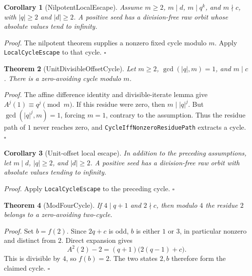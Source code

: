 \documentclass[11pt,letterpaper]{article}
\newtheorem{theorem}{Theorem}
\newtheorem{corollary}[theorem]{Corollary}
\newenvironment{proof}{\noindent\textit{Proof.}}{\hfill\(\square\)}
\begin{document}
\begin{corollary}[NilpotentLocalEscape]
Assume \(m\ge2\), \(m\mid d\), \(m\mid q^k\), and \(m\nmid c\),
with \(|q|\ge2\) and \(|d|\ge2\). A positive seed has a
division-free raw orbit whose absolute values tend to infinity.
\end{corollary}

\begin{proof}
The nilpotent theorem supplies a nonzero fixed cycle modulo \(m\).
Apply \texttt{Local\allowbreak Cycle\allowbreak Escape} to that cycle.
\end{proof}

\begin{theorem}[UnitDivisibleOffsetCycle]
Let \(m\ge2\), \(\gcd(|q|,m)=1\), and \(m\mid c\).
There is a zero-avoiding cycle modulo \(m\).
\end{theorem}

\begin{proof}
The affine difference identity and divisible-iterate lemma give
\(A^j(1)\equiv q^j\pmod m\). If this residue were zero, then
\(m\mid |q|^j\). But \(\gcd(|q|^j,m)=1\), forcing \(m=1\),
contrary to the assumption. Thus the residue path of \(1\) never
reaches zero, and \texttt{Cycle\allowbreak Iff\allowbreak Nonzero\allowbreak Residue\allowbreak Path} extracts a cycle.
\end{proof}

\begin{corollary}[Unit-offset local escape]
In addition to the preceding assumptions, let \(m\mid d\),
\(|q|\ge2\), and \(|d|\ge2\). A positive seed has a
division-free raw orbit with absolute values tending to infinity.
\end{corollary}

\begin{proof}
Apply \texttt{Local\allowbreak Cycle\allowbreak Escape} to the preceding cycle.
\end{proof}

\begin{theorem}[ModFourCycle]
If \(4\mid q+1\) and \(2\nmid c\), then modulo \(4\) the residue
\(2\) belongs to a zero-avoiding two-cycle.
\end{theorem}

\begin{proof}
Set \(b=f(2)\). Since \(2q+c\) is odd, \(b\) is either \(1\)
or \(3\), in particular nonzero and distinct from \(2\).
Direct expansion gives
\[
 A^2(2)-2=(q+1)\bigl(2(q-1)+c\bigr).
\]
This is divisible by \(4\), so \(f(b)=2\).
The two states \(2,b\) therefore form the claimed cycle.
\end{proof}
\end{document}
